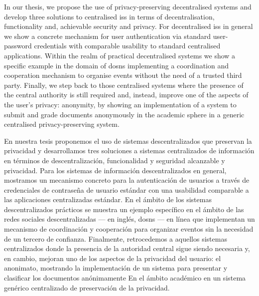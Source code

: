     In our thesis, we propose the use of privacy-preserving decentralised systems 
    and develop three solutions to centralised \aclp*{is} in terms of decentralisation, 
    functionality and, achievable security and privacy. For decentralised \aclp*{is} 
    in general we show a concrete mechanism for user authentication via standard 
    user-password credentials with comparable usability to standard centralised 
    applications. Within the realm of practical decentralised systems we show a 
    specific example in the domain of \aclp*{dosn} implementing a coordination and 
    cooperation mechanism to organise events without the need of a trusted third 
    party. Finally, we step back to those centralised systems where the presence 
    of the central authority is still required and, instead, improve one of the 
    aspects of the user's privacy: anonymity, by showing an implementation of a 
    system to submit and grade documents anonymously in the academic sphere in a 
    generic centralised privacy-preserving system.
    
    En nuestra tesis proponemos el uso de sistemas descentralizados que preservan 
    la privacidad y desarrollamos tres soluciones a sistemas centralizados de información 
    en términos de descentralización, funcionalidad y seguridad alcanzable y privacidad. 
    Para los sistemas de información descentralizados en general, mostramos un mecanismo 
    concreto para la autenticación de usuarios a través de credenciales de contraseña 
    de usuario estándar con una usabilidad comparable a las aplicaciones centralizadas 
    estándar. En el ámbito de los sistemas descentralizados prácticos se muestra 
    un ejemplo específico en el ámbito de las redes sociales descentralizadas --- en inglés, \aclp*{dosn} --- en 
    línea que implementan un mecanismo de coordinación y cooperación para organizar 
    eventos sin la necesidad de un tercero de confianza. Finalmente, retrocedemos 
    a aquellos sistemas centralizados donde la presencia de la autoridad central 
    sigue siendo necesaria y, en cambio, mejoran uno de los aspectos de la privacidad 
    del usuario: el anonimato, mostrando la implementación de un sistema para presentar 
    y clasificar los documentos anónimamente En el ámbito académico en un sistema 
    genérico centralizado de preservación de la privacidad.
    
